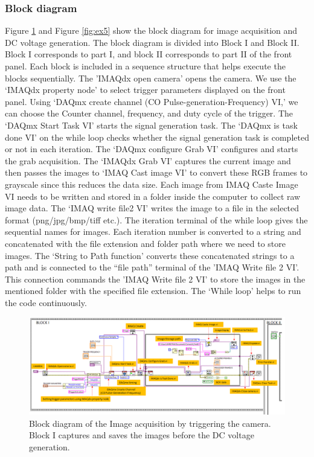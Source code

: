 \documentclass[journal=jacsat,manuscript=article]{achemso}
\begin{document}
\subsubsection{Block diagram}
Figure \ref{fig:ex4} and Figure \ref{fig:ex5} show the block diagram for image acquisition and DC voltage generation. The block diagram is divided into Block I and Block II. Block I corresponds to part I, and block II corresponds to part II of the front panel. Each block is included in a sequence structure that helps execute the blocks sequentially. The 'IMAQdx open camera' opens the camera. We use the ‘IMAQdx property node’ to select trigger parameters displayed on the front panel. Using ‘DAQmx create channel (CO Pulse-generation-Frequency) VI,’ we can choose the Counter channel, frequency, and duty cycle of the trigger. The ‘DAQmx Start Task VI’ starts the signal generation task.  The ‘DAQmx is task done VI’ on the while loop checks whether the signal generation task is completed or not in each iteration. The ‘DAQmx configure Grab VI’ configures and starts the grab acquisition. The ‘IMAQdx Grab VI’ captures the current image and then passes the images to ‘IMAQ Cast image VI’ to convert these RGB frames to grayscale since this reduces the data size. Each image from IMAQ Caste Image VI needs to be written and stored in a folder inside the computer to collect raw image data. The ‘IMAQ write file2 VI’ writes the image to a file in the selected format (png/jpg/bmp/tiff etc.). The iteration terminal of the while loop gives the sequential names for images. Each iteration number is converted to a string and concatenated with the file extension and folder path where we need to store images. The ‘String to Path function’ converts these concatenated strings to a path and is connected to the “file path” terminal of the 'IMAQ Write file 2 VI'. This connection commands the 'IMAQ Write file 2 VI' to store the images in the mentioned folder with the specified file extension. The ‘While loop’ helps to run the code continuously. 
\begin{figure}[H]
    \centering
    \includegraphics[width=1.3\linewidth,angle=90 ]{BLOCK1.png}
    \caption{Block diagram of the Image acquisition by triggering the camera. Block I captures and saves the images before the DC voltage generation.}
    \label{fig:ex4}
\end{figure}
\end{document}
